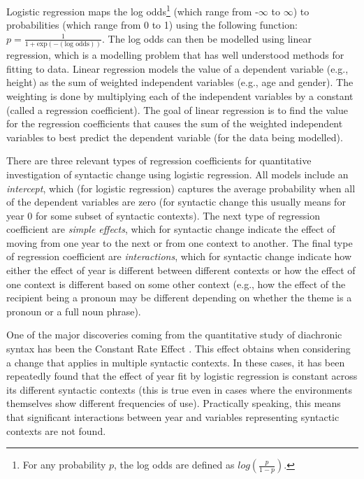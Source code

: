 	Logistic regression maps the log odds\footnote{For any probability $p$, the log odds are defined as $log(\frac{p}{1-p})$.} (which range from -$\infty$ to $\infty$) to probabilities (which range from 0 to 1) using the following function: $p=\frac{1}{1+\text{exp}(-(\text{log odds}))}$. The log odds can then be modelled using linear regression, which is a modelling problem that has well understood methods for fitting to data. Linear regression models the value of a dependent variable (e.g., height) as the sum of weighted independent variables (e.g., age and gender). The weighting is done by multiplying each of the independent variables by a constant (called a regression coefficient). The goal of linear regression is to find the value for the regression coefficients that causes the sum of the weighted independent variables to best predict the dependent variable (for the data being modelled).

	There are three relevant types of regression coefficients for quantitative investigation of syntactic change using logistic regression. All models include an \textit{intercept}, which (for logistic regression) captures the average probability when all of the dependent variables are zero (for syntactic change this usually means for year 0 for some subset of syntactic contexts). The next type of regression coefficient are \textit{simple effects}, which for syntactic change indicate the effect of moving from one year to the next or from one context to another. The final type of regression coefficient are \textit{interactions}, which for syntactic change indicate how either the effect of year is different between different contexts or how the effect of one context is different based on some other context (e.g., how the effect of the recipient being a pronoun may be different depending on whether the theme is a pronoun or a full noun phrase).

	One of the major discoveries coming from the quantitative study of diachronic syntax has been the Constant Rate Effect \citep{Kroch.1989,Kroch.1994}. This effect obtains when considering a change that applies in multiple syntactic contexts. In these cases, it has been repeatedly found that the effect of year fit by logistic regression is constant across its different syntactic contexts (this is true even in cases where the environments themselves show different frequencies of use). Practically speaking, this means that significant interactions between year and variables representing syntactic contexts are not found.

